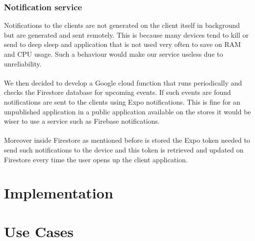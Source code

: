\documentclass[10pt]{article}
\begin{document}
	\subsubsection{Notification service}
	Notifications to the clients are not generated on the client itself in background but are generated and sent remotely. This is because many devices tend to kill or send to deep sleep and application that is not used very often to save on RAM and CPU usage. Such a behaviour would make our service useless due to unreliability. \\\\ We then decided to develop a Google cloud function that runs periodically and checks the Firestore database for upcoming events. If such events are found notifications are sent to the clients using Expo notifications. This is fine for an unpublished application in a public application available on the stores it would be wiser to use a service such as Firebase notifications.\\\\ Moreover inside Firestore as mentioned before is stored the Expo token needed to send such notifications to the device and this token is retrieved and updated on Firestore every time the user opens up the client application.
	
	\section{Implementation}
	
	\section{Use Cases}
    
\end{document}
